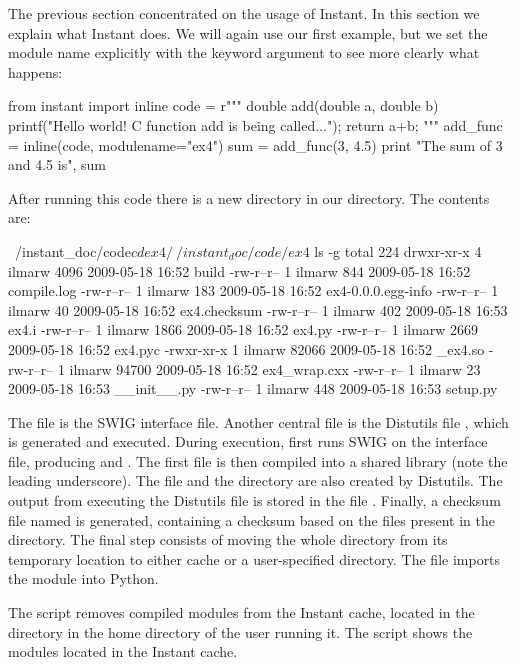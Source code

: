 The previous section concentrated on the usage of Instant.  In this
section we explain what Instant does.  We will again use our first
example, but we set the module name explicitly with the keyword
argument  to see more clearly what happens:
\begin{python}
from instant import inline
code = r"""
double add(double a, double b)
{
  printf("Hello world! C function add is being called...\n");
  return a+b;
}"""
add_func = inline(code, modulename="ex4")
sum = add_func(3, 4.5)
print "The sum of 3 and 4.5 is", sum
\end{python}
After running this code there is a new directory  in our directory.
The contents are:
\begin{progoutput}
~/instant_doc/code$ cd ex4/
~/instant_doc/code/ex4$ ls -g
total 224
drwxr-xr-x 4 ilmarw  4096 2009-05-18 16:52 build
-rw-r--r-- 1 ilmarw   844 2009-05-18 16:52 compile.log
-rw-r--r-- 1 ilmarw   183 2009-05-18 16:52 ex4-0.0.0.egg-info
-rw-r--r-- 1 ilmarw    40 2009-05-18 16:52 ex4.checksum
-rw-r--r-- 1 ilmarw   402 2009-05-18 16:53 ex4.i
-rw-r--r-- 1 ilmarw  1866 2009-05-18 16:52 ex4.py
-rw-r--r-- 1 ilmarw  2669 2009-05-18 16:52 ex4.pyc
-rwxr-xr-x 1 ilmarw 82066 2009-05-18 16:52 _ex4.so
-rw-r--r-- 1 ilmarw 94700 2009-05-18 16:52 ex4_wrap.cxx
-rw-r--r-- 1 ilmarw    23 2009-05-18 16:53 __init__.py
-rw-r--r-- 1 ilmarw   448 2009-05-18 16:53 setup.py
\end{progoutput}
The file  is the SWIG interface file.
Another central file is the Distutils file , which is generated
and executed. During execution,  first runs SWIG on the interface file,
producing  and . The first file
is then compiled into a shared library  
(note the leading underscore). The file 
and the directory  are also created by Distutils.
The output from executing the Distutils file is stored in the file
.  Finally, a checksum file named
 is generated, containing a checksum based on
the files present in the directory. The final step consists of moving
the whole directory from its temporary location to either cache or a
user-specified directory. The file 
imports the module
 into Python.

The script  removes
compiled modules from the Instant cache, located in the directory
 in the home directory of the user running it.
The script 
shows the modules located in the Instant cache.


